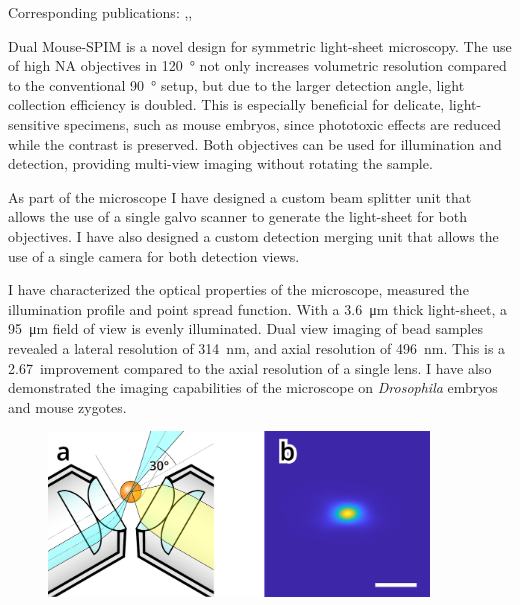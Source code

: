 \documentclass{booklet_style}
\begin{document}
    Corresponding publications: \cite{de_medeiros_light-sheet_2016},\cite{strnad_inverted_2016}, \cite{hoyer_breaking_2016}

    Dual Mouse-SPIM is a novel design for symmetric light-sheet microscopy. The use of high NA objectives in \SI{120}{\degree} not only increases volumetric resolution compared to the conventional \SI{90}{\degree} setup, but due to the larger detection angle, light collection efficiency is doubled. This is especially beneficial for delicate, light-sensitive specimens, such as mouse embryos, since phototoxic effects are reduced while the contrast is preserved. Both objectives can be used for illumination and detection, providing multi-view imaging without rotating the sample.

    As part of the microscope I have designed a custom beam splitter unit that allows the use of a single galvo scanner to generate the light-sheet for both objectives. I have also designed a custom detection merging unit that allows the use of a single camera for both detection views.

    I have characterized the optical properties of the microscope, measured the illumination profile and point spread function. With a \SI{3.6}{\micro m} thick light-sheet, a \SI{95}{\micro m} field of view is evenly illuminated. Dual view imaging of bead samples revealed a lateral resolution of \SI{314}{nm}, and axial resolution of \SI{496}{nm}. This is a 2.67\texttimes\ improvement compared to the axial resolution of a single lens. I have also demonstrated the imaging capabilities of the microscope on \textit{Drosophila} embryos and mouse zygotes.

    \begin{figure}
      \centering
      \includegraphics[width=0.9\textwidth]{2_DualMouse/120+psf}
      \label{fig:DualMouse}
    \end{figure}
\end{document}
